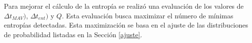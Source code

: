 Para mejorar el cálculo de la entropía se realizó una evaluación de los valores de $\Delta t_{MAV})$, $\Delta t_{ent})$ y $Q$.
Esta evaluación busca maximizar el número de mínimas entropías detectadas.
Esta maximización se basa en el ajuste de las distribuciones de probabilidad listadas en la Sección \ref{ajuste}.




	

